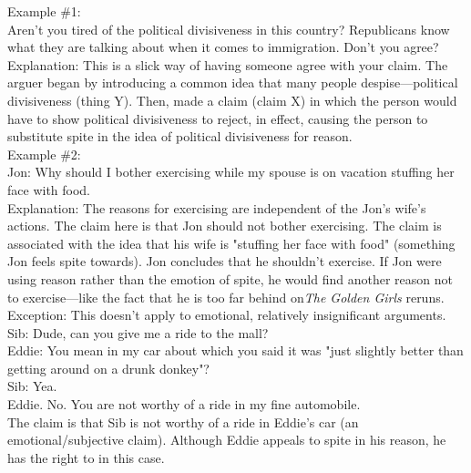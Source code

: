 \documentclass[a4paper,12pt,single,pdftex]{scrartcl}
\begin{document}
    
      Example \#1:
    \\

    
      Aren't you tired of the political divisiveness in this country? Republicans know what they are talking about when it comes to immigration. Don't you agree?
    \\

    
      Explanation: This is a slick way of having someone agree with your claim. The arguer began by introducing a common idea that many people despise—political divisiveness (thing Y). Then, made a claim (claim X) in which the person would have to show political divisiveness to reject, in effect, causing the person to substitute spite in the idea of political divisiveness for reason.
    \\

    
      Example \#2:
    \\

    
      Jon: Why should I bother exercising while my spouse is on vacation stuffing her face with food.
    \\

    
      Explanation: The reasons for exercising are independent of the Jon's wife's actions. The claim here is that Jon should not bother exercising. The claim is associated with the idea that his wife is "stuffing her face with food" (something Jon feels spite towards). Jon concludes that he shouldn't exercise. If Jon were using reason rather than the emotion of spite, he would find another reason not to exercise—like the fact that he is too far behind on{\it  The Golden Girls}  reruns.
    \\

    
      Exception: This doesn't apply to emotional, relatively insignificant arguments.
    \\

    
      Sib: Dude, can you give me a ride to the mall?
    \\

    
      Eddie: You mean in my car about which you said it was "just slightly better than getting around on a drunk donkey"?
    \\

    
      Sib: Yea.
    \\

    
      Eddie. No. You are not worthy of a ride in my fine automobile.
    \\

    
      The claim is that Sib is not worthy of a ride in Eddie's car (an emotional/subjective claim). Although Eddie appeals to spite in his reason, he has the right to in this case.
    \\
\end{document}
